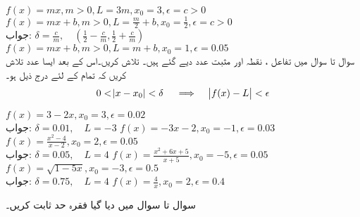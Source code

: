 $f(x)=mx,m>0,L=3m,x_0=3,\epsilon=c>0$
$f(x)=mx+b,m>0,L=\tfrac{m}{2}+b,x_0=\tfrac{1}{2},\epsilon=c>0$\\
جواب:\quad
$\delta=\tfrac{c}{m},\quad (\tfrac{1}{2}-\tfrac{c}{m},\tfrac{1}{2}+\tfrac{c}{m})$
$f(x)=mx+b,m>0,L=m+b,x_0=1,\epsilon=0.05$
\\
سوال  تا سوال  میں تفاعل ، نقطہ  اور مثبت عدد  دیے گئے ہیں۔ تلاش کریں۔اس کے بعد ایسا عدد  تلاش کریں کہ تمام  کے لئے درج ذیل ہو۔
\begin{align*}
0<\abs{x-x_0}<\delta\quad \implies \quad \abs{f(x)-L}<\epsilon
\end{align*} 

$f(x)=3-2x,x_0=3,\epsilon=0.02$\\
جواب:\quad
$\delta=0.01,\quad L=-3$
$f(x)=-3x-2,x_0=-1,\epsilon=0.03$
$f(x)=\tfrac{x^2-4}{x-2},x_0=2,\epsilon=0.05$\\
جواب:\quad
$\delta=0.05,\quad L=4$
$f(x)=\tfrac{x^2+6x+5}{x+5},x_0=-5,\epsilon=0.05$
$f(x)=\sqrt{1-5x},x_0=-3,\epsilon=0.5$\\
جواب:\quad
$\delta=0.75,\quad L=4$
$f(x)=\tfrac{4}{x},x_0=2,\epsilon=0.4$

سوال  تا سوال  میں دیا گیا فقرہ حد ثابت کریں۔

